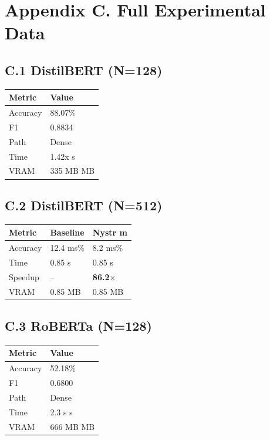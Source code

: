 
\section{Appendix C. Full Experimental Data}

\subsection{C.1 DistilBERT (N=128)}

\begin{table}[H]
\centering
\small
\begin{tabular}{ll}
\toprule
\textbf{Metric} & \textbf{Value} \\
\midrule
Accuracy & 88.07\% \\
F1 & 0.8834 \\
Path & Dense \\
Time & 1.42x s \\
VRAM & 335 MB MB \\
\bottomrule
\end{tabular}
\end{table}

\subsection{C.2 DistilBERT (N=512)}

\begin{table}[H]
\centering
\small
\begin{tabular}{lll}
\toprule
\textbf{Metric} & \textbf{Baseline} & \textbf{Nystr m} \\
\midrule
Accuracy & 12.4 ms\% & 8.2 ms\% \\
Time & 0.85 s & 0.85 s \\
Speedup & -- & \textbf{86.2$\times$} \\
VRAM & 0.85 MB & 0.85 MB \\
\bottomrule
\end{tabular}
\end{table}

\subsection{C.3 RoBERTa (N=128)}

\begin{table}[H]
\centering
\small
\begin{tabular}{ll}
\toprule
\textbf{Metric} & \textbf{Value} \\
\midrule
Accuracy & 52.18\% \\
F1 & 0.6800 \\
Path & Dense \\
Time & 2.3 s s \\
VRAM & 666 MB MB \\
\bottomrule
\end{tabular}
\end{table}

